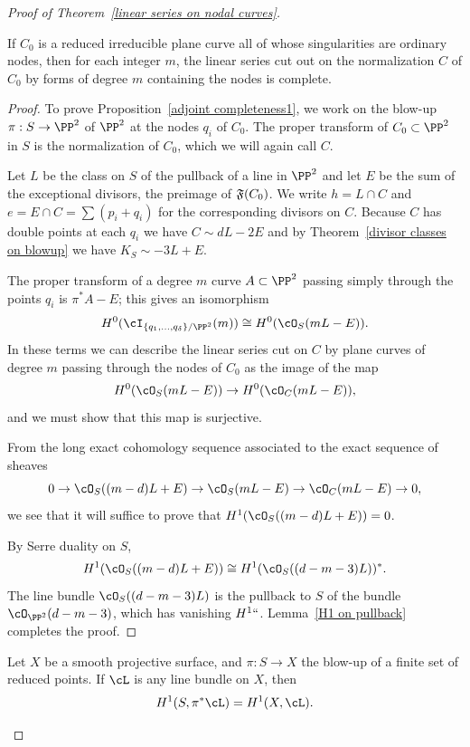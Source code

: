 \begin{proof}[Proof of Theorem~\ref{linear series on nodal curves}]
\begin{proposition}\label{adjoint completeness1}
If $C_{0}$ is a reduced irreducible plane curve all of whose singularities
are ordinary nodes, then for each
integer $m$,
the linear series cut out on the normalization $C$ of $C_{0}$ by forms
of degree $m$ containing the nodes
is complete.
\end{proposition}

\begin{proof}
To prove Proposition~\ref{adjoint completeness1}, we work on the blow-up
$\pi : S \to \PP^2$ of $\PP^2$ at the nodes $q_i$ of $C_0$. The proper
transform of $C_0 \subset \PP^2$ in $S$ is the normalization of $C_0$,
%
which we will again call $C$.

Let $L$ be the class on $S$ of the pullback of a line in $\PP^2$
and let $E$ be the sum of the exceptional divisors, the preimage of
$\adj(C_{0})$. We write $h= L\cap C$ and $e = E\cap C= \sum (p_i+q_i)$
for the corresponding divisors on $C$.
Because $C$ has double points at each $q_{i}$ we have
$
C \sim dL - 2E
$
and   by
Theorem~\ref{divisor classes on blowup} we have $K_S \sim -3L + E$.

The proper transform of a degree $m$ curve $A\subset \PP^2$  passing
simply through the points $q_i$
is $\pi^*A - E$; this gives an isomorphism
$$
H^0(\cI_{\{q_1,\dots,q_\delta\}/\PP^2}(m)) \cong H^0(\cO_S(mL-E)).
$$
In these terms we can describe the linear series cut on $C$ by plane
curves of degree $m$ passing through the nodes of $C_0$ as the image of
the map
$$
H^0(\cO_S(mL-E)) \to H^0(\cO_C(mL-E)),
$$
and we must show that this map is surjective.

From the long exact cohomology sequence associated to the exact sequence
of sheaves
$$
0 \to \cO_S((m-d)L + E)  \to \cO_S(mL-E) \to \cO_C(mL-E) \to 0,
$$
 we see that it will suffice to prove that $H^1(\cO_S((m-d)L + E)) = 0$.

By Serre duality on $S$,
$$
H^1(\cO_S((m-d)L + E)) \cong H^1(\cO_S((d-m-3)L))^*.
$$
The line bundle $\cO_S((d-m-3)L)$ is
 the pullback to $S$ of the bundle $\cO_{\PP^2}(d-m-3)$, which has
 vanishing $H^1` `$. Lemma~\ref{H1 on pullback} completes the proof.
\end{proof}

\begin{lemma}\label{H1 on pullback}
Let $X$ be a smooth projective surface, and $\pi : S \to X$ the 
%
blow-up of
a finite set of reduced points. If $\cL$ is any line bundle on $X$, then
$$
H^1(S, \pi^*\cL) = H^1(X, \cL).
$$
\end{lemma}


\end{proof}
